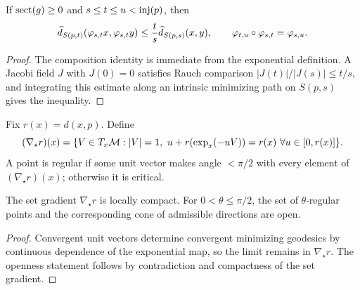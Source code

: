 \begin{proposition}
\label{prop:chow-iii-i29-small-sphere-monotonicity}
If $\operatorname{sect}(g)\ge0$ and $s\le t\le u<\operatorname{inj}(p)$, then
\[
\widehat d_{S(p,t)}(\varphi_{s,t}x,\varphi_{s,t}y)
\le\frac ts\widehat d_{S(p,s)}(x,y),\qquad
\varphi_{t,u}\circ\varphi_{s,t}=\varphi_{s,u}.
\]
\end{proposition}
\begin{proof}
\sketch
The composition identity is immediate from the exponential definition.  A
Jacobi field $J$ with $J(0)=0$ satisfies Rauch comparison
$|J(t)|/|J(s)|\le t/s$, and integrating this estimate along an intrinsic
minimizing path on $S(p,s)$ gives the inequality.
\end{proof}

\begin{definition}
\label{def:chow-iii-i30-i31-gradient-regularity}
Fix $r(x)=d(x,p)$.  Define
\[
(\nabla_\star r)(x)=\{V\in T_x\mathcal M:|V|=1,\ u+r(\exp_x(-uV))=r(x)\ \forall u\in[0,r(x)]\}.
\]
A point is regular if some unit vector makes angle $<\pi/2$ with every element
of $(\nabla_\star r)(x)$; otherwise it is critical.
\end{definition}

\begin{lemma}
\label{lem:chow-iii-i30-i33-regular-open}
The set gradient $\nabla_\star r$ is locally compact.  For
$0<\theta\le\pi/2$, the set of $\theta$-regular points and the corresponding
cone of admissible directions are open.
\end{lemma}
\begin{proof}
\sketch
Convergent unit vectors determine convergent minimizing geodesics by continuous
dependence of the exponential map, so the limit remains in $\nabla_\star r$.
The openness statement follows by contradiction and compactness of the set
gradient.
\end{proof}

